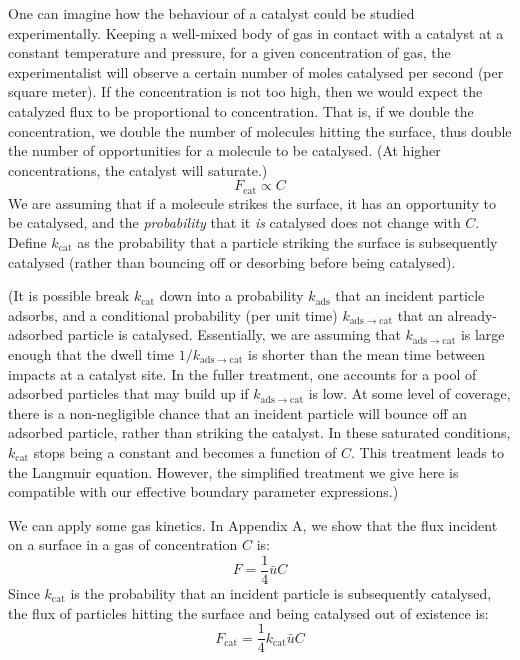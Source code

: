 \documentclass[12pt, a4paper, twoside, openright]{book}
\newcommand{\Fcat}{\ensuremath{F_{\mathrm{cat}}}}
\newcommand{\kcat}{\ensuremath{k_{\mathrm{cat}}}}
\newcommand{\kads}{\ensuremath{k_{\mathrm{ads}}}}
\newcommand{\kadscat}{\ensuremath{k_{\mathrm{ads \to cat}}}}
\begin{document}
One can imagine how the behaviour of a catalyst could be studied experimentally.
Keeping a well-mixed body of gas in contact with a catalyst at a constant temperature and pressure, for a given concentration of gas, the experimentalist will observe a certain number of moles catalysed per second (per square meter).  If the concentration is not too high, then we would expect the catalyzed flux to be proportional to concentration. That is, if we double the concentration, we double the number of molecules hitting the surface, thus double the number of opportunities for a molecule to be catalysed.  (At higher concentrations, the catalyst will saturate.)
\begin{equation}
\Fcat \propto C 
\end{equation}
We are assuming that if a molecule strikes the surface, it has an opportunity to be catalysed, and the \emph{probability} that it \emph{is} catalysed does not change with $C$.  Define $\kcat$ as the probability that a particle striking the surface is subsequently catalysed (rather than bouncing off or desorbing before being catalysed).

(It is possible break $\kcat$ down into a probability $\kads$ that an incident particle adsorbs, and a conditional probability (per unit time) $\kadscat$ that an already-adsorbed particle is catalysed. Essentially, we are assuming that $\kadscat$ is large enough that the dwell time $1/ \kadscat$ is shorter than the mean time between impacts at a catalyst site. In the fuller treatment, one accounts for a pool of adsorbed particles that may build up if $\kadscat$ is low.
At some level of coverage, there is a non-negligible chance that an incident particle will bounce off an adsorbed particle, rather than striking the catalyst.  In these saturated conditions, $\kcat$ stops being a constant and becomes a function of $C$.
This treatment leads to the Langmuir equation.  However, the simplified treatment we give here is compatible with our effective boundary parameter expressions.)

We can apply some gas kinetics.  In Appendix A, we show that the flux incident on a surface in a gas of concentration $C$ is:
\begin{equation}
F = \frac{1}{4} \bar{u} C
\end{equation}
Since $\kcat$ is the probability that an incident particle is subsequently catalysed, the flux of particles hitting the surface and being catalysed out of existence is:
\begin{equation}
\Fcat = \frac{1}{4} \kcat \bar{u} C
\end{equation}
\end{document}

